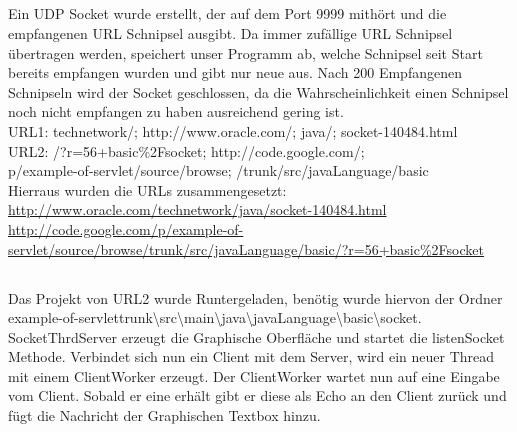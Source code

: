\documentclass[12pt]{article}
\theoremstyle{plain}
\begin{document}
\subsection{}
Ein UDP Socket wurde erstellt, der auf dem Port 9999 mithört und die empfangenen URL Schnipsel ausgibt. Da immer zufällige URL Schnipsel übertragen werden, speichert unser Programm ab, welche Schnipsel seit Start bereits empfangen wurden und gibt nur neue aus. Nach 200 Empfangenen Schnipseln wird der Socket geschlossen, da die Wahrscheinlichkeit einen Schnipsel noch nicht empfangen zu haben ausreichend gering ist.\\
URL1: technetwork/; http://www.oracle.com/; java/; socket-140484.html\\
URL2: /?r=56+basic\%2Fsocket; http://code.google.com/; \\\indent
\quad p/example-of-servlet/source/browse; /trunk/src/javaLanguage/basic\\
Hierraus wurden die URLs zusammengesetzt:\\
\url{http://www.oracle.com/technetwork/java/socket-140484.html}\\
\url{http://code.google.com/p/example-of-servlet/source/browse/trunk/src/javaLanguage/basic/?r=56+basic\%2Fsocket}
\subsection{}
Das Projekt von URL2 wurde Runtergeladen, benötig wurde hiervon der Ordner example-of-servlettrunk\textbackslash src\textbackslash main\textbackslash java\textbackslash javaLanguage\textbackslash basic\textbackslash socket.\\
SocketThrdServer erzeugt die Graphische Oberfläche und startet die listenSocket Methode. Verbindet sich nun ein Client mit dem Server, wird ein neuer Thread mit einem ClientWorker erzeugt. Der ClientWorker wartet nun auf eine Eingabe vom Client. Sobald er eine erhält gibt er diese als Echo an den Client zurück und fügt die Nachricht der Graphischen Textbox hinzu.
\end{document}
